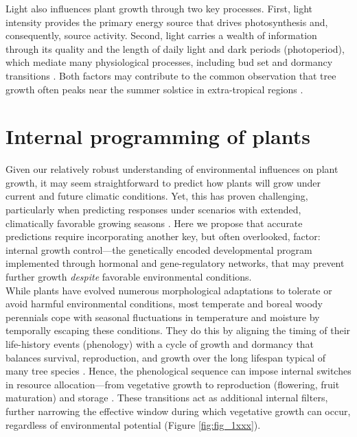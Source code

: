 \documentclass{article}
\begin{document}
		Light also influences plant growth through two key processes. First, light intensity provides the primary energy source that drives photosynthesis and, consequently, source activity. Second, light carries a wealth of information through its quality and the length of daily light and dark periods (photoperiod), which mediate many physiological processes, including bud set and dormancy transitions \citep{wangPlantsDistinguishDifferent2024b}. Both factors may contribute to the common observation that tree growth often peaks near the summer solstice in extra-tropical regions \citep{rossiConifersColdEnvironments2006, etzoldNumberGrowthDays2021, luoSummerSolsticeMarks2018}. %
		
		\section*{Internal programming of plants}
		Given our relatively robust understanding of environmental influences on plant growth, it may seem straightforward to predict how plants will grow under current and future climatic conditions. Yet, this has proven challenging, particularly when predicting responses under scenarios with extended, climatically favorable growing seasons \citep{zohnerHowChangesSpring2021}. Here we propose that accurate predictions require incorporating another key, but often overlooked, factor: internal growth control---the genetically encoded developmental program implemented through hormonal and gene-regulatory networks, that may prevent further growth \textit{despite} favorable environmental conditions.\\ 
		
		While plants have evolved numerous morphological adaptations to tolerate or avoid harmful environmental conditions, most temperate and boreal woody perennials cope with seasonal fluctuations in temperature and moisture by temporally escaping these conditions. They do this by aligning the timing of their life-history events (phenology) %
		 with a cycle of growth and dormancy that balances survival, reproduction, and growth over the long lifespan typical of many tree species \citep{delpierreTemperateBorealForest2016}. Hence, the phenological sequence can impose internal switches in resource allocation---from vegetative growth to reproduction (flowering, fruit maturation) and storage \citep{stearnsTradeOffsLifeHistoryEvolution1989, chapinEcologyEconomicsStorage1990}. These transitions act as additional internal filters, further narrowing the effective window during which vegetative growth can occur, regardless of environmental potential (Figure \ref{fig:fig_1xxx}).\\
		
\end{document}
